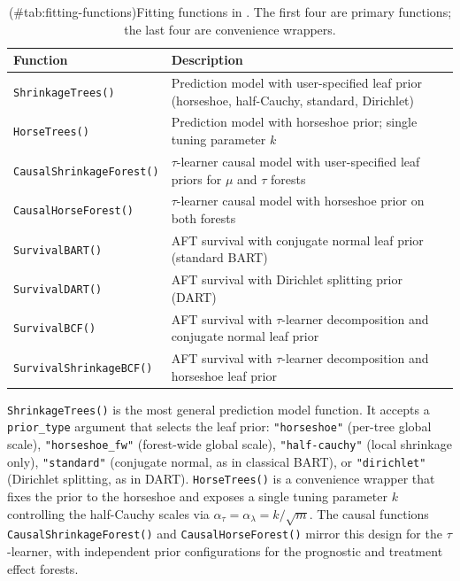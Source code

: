 \begin{table}[!h]
\centering
\caption{(\#tab:fitting-functions)Fitting functions in . The first four
                        are primary functions; the last four are convenience wrappers.}
\centering
\begin{tabular}[t]{>{\raggedright\arraybackslash}p{4.5cm}>{\raggedright\arraybackslash}p{9.5cm}}
\toprule
Function & Description\\
\midrule
\texttt{ShrinkageTrees()} & Prediction model with user-specified leaf prior (horseshoe, half-Cauchy, standard, Dirichlet)\\
\texttt{HorseTrees()} & Prediction model with horseshoe prior; single tuning parameter $k$\\
\texttt{CausalShrinkageForest()} & $\tau$-learner causal model with user-specified leaf priors for $\mu$ and $\tau$ forests\\
\texttt{CausalHorseForest()} & $\tau$-learner causal model with horseshoe prior on both forests\\
\midrule
\texttt{SurvivalBART()} & AFT survival with conjugate normal leaf prior (standard BART)\\
\addlinespace
\texttt{SurvivalDART()} & AFT survival with Dirichlet splitting prior (DART)\\
\texttt{SurvivalBCF()} & AFT survival with $\tau$-learner decomposition and conjugate normal leaf prior\\
\texttt{SurvivalShrinkageBCF()} & AFT survival with $\tau$-learner decomposition and horseshoe leaf prior\\
\bottomrule
\end{tabular}
\end{table}

\texttt{ShrinkageTrees()} is the most general prediction model function. It accepts a \texttt{prior\_type} argument that selects the leaf prior: \texttt{"horseshoe"} (per-tree global scale), \texttt{"horseshoe\_fw"} (forest-wide global scale), \texttt{"half-cauchy"} (local shrinkage only), \texttt{"standard"} (conjugate normal, as in classical BART), or \texttt{"dirichlet"} (Dirichlet splitting, as in DART). \texttt{HorseTrees()} is a convenience wrapper that fixes the prior to the horseshoe and exposes a single tuning parameter \(k\) controlling the half-Cauchy scales via \(\alpha_\tau = \alpha_\lambda = k / \sqrt{m}\). The causal functions \texttt{CausalShrinkageForest()} and \texttt{CausalHorseForest()} mirror this design for the \(\tau\)-learner, with independent prior configurations for the prognostic and treatment effect forests.

